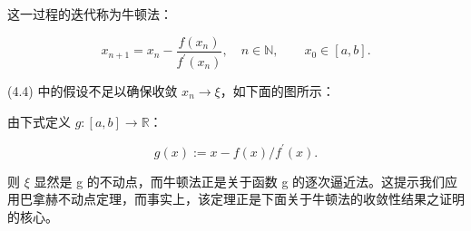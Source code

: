 这一过程的迭代称为牛顿法：

\[
x_{n+1}=x_{n}-\frac{f(x_{n})}{f^{\prime}(x_{n})},\quad n\in\mathbb{N},\qquad x_{0}\in[a,b].
\]

(4.4) 中的假设不足以确保收敛 $ x_{n} \to \xi $，如下面的图所示：


由下式定义 $ g\colon [a,b]\to\mathbb{R} $：

\begin{equation}
g(x):=x-f(x)/f^{\prime}(x).
\end{equation}

则 $\xi$ 显然是 g 的不动点，而牛顿法正是关于函数 g 的逐次逼近法。这提示我们应用巴拿赫不动点定理，而事实上，该定理正是下面关于牛顿法的收敛性结果之证明的核心。

